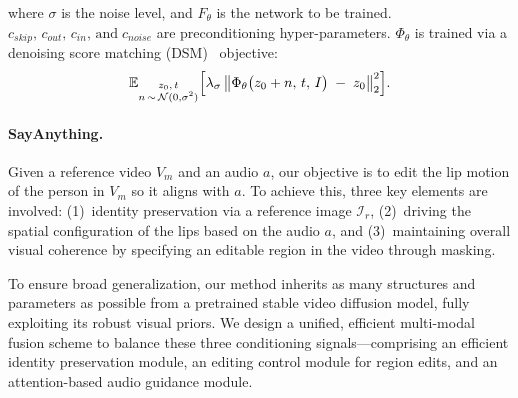 where \(\sigma\) is the noise level, and \(F_\theta\) is the network to be trained. 
\(c_{skip},\, c_{out},\, c_{in},\, \text{and}\; c_{noise}\) are preconditioning hyper-parameters.
\noindent
\(\Phi_\theta\) is trained via a denoising score matching (DSM)~\citep{song2019generative} objective:
\begin{equation}
\setlength{\abovedisplayskip}{3pt}
\mathbb{E}_{\substack{z_0,\,t\\n\,\sim\,\mathcal{N}(0,\sigma^2)}}
\Bigl[
  \lambda_\sigma
  \,\bigl\|
    \Phi_\theta\bigl(z_0 + n,\, t,\, I\bigr)
    \;-\;
    z_0
  \bigr\|_2^2
\Bigr].
\label{eq:edm_dsm}
\setlength{\belowdisplayskip}{3pt}
\end{equation}
\paragraph{SayAnything.}
Given a reference video $V_m$ and an audio $a$, our objective is to edit the lip motion of the person in $V_m$ so it aligns with $a$. 
To achieve this, three key elements are involved:
(1)~identity preservation via a reference image $\mathcal{I}_r$,
(2)~driving the spatial configuration of the lips based on the audio $a$,
and 
(3)~maintaining overall visual coherence by specifying an editable region in the video through masking.

To ensure broad generalization, our method inherits as many structures and parameters as possible from a pretrained stable video diffusion model, fully exploiting its robust visual priors. We design a unified, efficient multi-modal fusion scheme to balance these three conditioning signals—comprising an efficient identity preservation module, an 
editing control module for region edits, and an attention-based audio guidance module.


